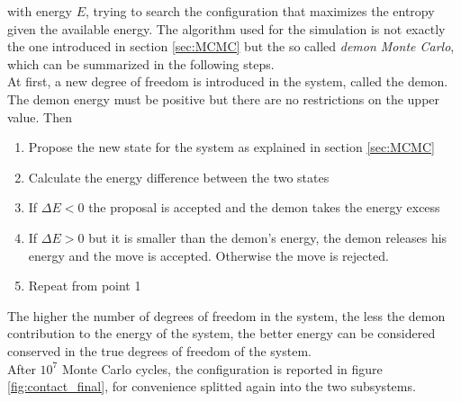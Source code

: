 with energy $E$, trying to search the configuration that maximizes the entropy given the available energy. The algorithm used for the simulation is not exactly the one introduced in section \ref{sec:MCMC} but the so called \emph{demon Monte Carlo}, which can be summarized in the following steps. \\
At first, a new degree of freedom is introduced in the system, called the demon. The demon energy must be positive but there are no restrictions on the upper value. Then
\begin{enumerate}
    \item Propose the new state for the system as explained in section \ref{sec:MCMC}
    \item Calculate the energy difference between the two states
    \item If $\Delta E < 0$ the proposal is accepted and the demon takes the energy excess
    \item If $\Delta E > 0$ but it is smaller than the demon's energy, the demon releases his energy and the move is accepted. Otherwise the move is rejected.
    \item Repeat from point 1
\end{enumerate}
The higher the number of degrees of freedom in the system, the less the demon contribution to the energy of the system, the better energy can be considered conserved in the true degrees of freedom of the system. \\
After $10^7$ Monte Carlo cycles, the configuration is reported in figure \ref{fig:contact_final}, for convenience splitted again into the two subsystems.
